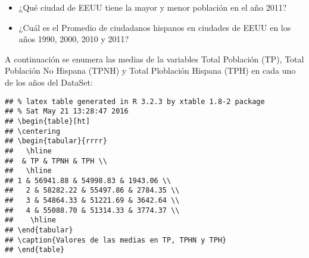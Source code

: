 \begin{itemize}
\item ¿Qué ciudad de EEUU tiene la mayor y menor población en el año 2011?
\end{itemize}



\begin{itemize}
\item ¿Cuál es el Promedio de ciudadanos hispanos en ciudades de EEUU en los años 1990, 2000, 2010 y 2011?
\end{itemize}

A continuación se enumera las medias de la variables Total Población (TP), Total Población  No Hispana (TPNH) y Total Ploblación Hispana (TPH) en cada uno de los años del DataSet:
\vspace{-1mm}
\begin{knitrout}
\color{fgcolor}\begin{kframe}
\begin{verbatim}
## % latex table generated in R 3.2.3 by xtable 1.8-2 package
## % Sat May 21 13:28:47 2016
## \begin{table}[ht]
## \centering
## \begin{tabular}{rrrr}
##   \hline
##  & TP & TPNH & TPH \\ 
##   \hline
## 1 & 56941.88 & 54998.83 & 1943.06 \\ 
##   2 & 58282.22 & 55497.86 & 2784.35 \\ 
##   3 & 54864.33 & 51221.69 & 3642.64 \\ 
##   4 & 55088.70 & 51314.33 & 3774.37 \\ 
##    \hline
## \end{tabular}
## \caption{Valores de las medias en TP, TPHN y TPH} 
## \end{table}
\end{verbatim}
\end{kframe}
\end{knitrout}

